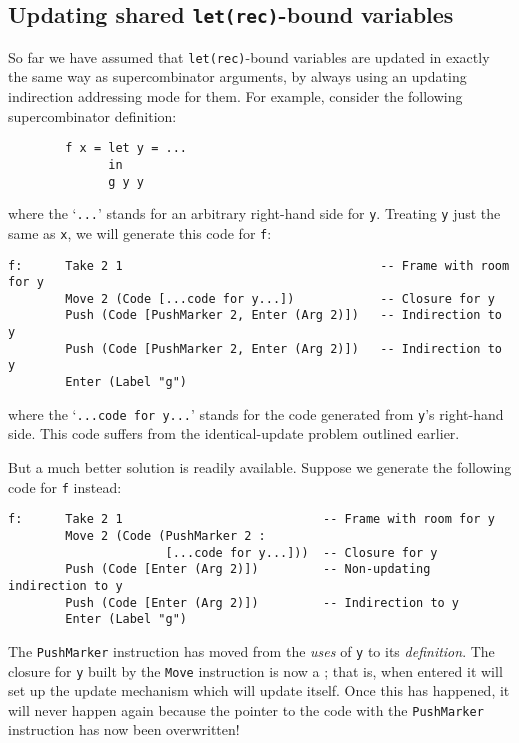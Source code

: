 \subsection{Updating shared \mbox{\tt let(rec)}-bound variables}
\label{sect:tim:self-update}

So far we have assumed that \mbox{\tt let(rec)}-bound variables are updated
in exactly the same way as supercombinator arguments, by always using
an updating indirection addressing mode for them.
For example, consider the following supercombinator definition:
\begin{verbatim}
        f x = let y = ...
              in
              g y y
\end{verbatim}
where the `\mbox{\tt ...}' stands for an arbitrary right-hand side for \mbox{\tt y}.
Treating \mbox{\tt y} just the same as \mbox{\tt x}, we will generate this code for \mbox{\tt f}:
\begin{verbatim}
f:      Take 2 1                                    -- Frame with room for y
        Move 2 (Code [...code for y...])            -- Closure for y
        Push (Code [PushMarker 2, Enter (Arg 2)])   -- Indirection to y
        Push (Code [PushMarker 2, Enter (Arg 2)])   -- Indirection to y
        Enter (Label "g")
\end{verbatim}
where the `\mbox{\tt ...code\ for\ y...}' stands for the code generated from
\mbox{\tt y}'s right-hand side.
This code suffers from the 
identical-update problem outlined earlier.

But a much better
solution is readily available.
Suppose we generate the following code for \mbox{\tt f} instead:
\begin{verbatim}
f:      Take 2 1                            -- Frame with room for y
        Move 2 (Code (PushMarker 2 :
                      [...code for y...]))  -- Closure for y
        Push (Code [Enter (Arg 2)])         -- Non-updating indirection to y
        Push (Code [Enter (Arg 2)])         -- Indirection to y
        Enter (Label "g")
\end{verbatim}
The \mbox{\tt PushMarker} instruction has moved from the {\em uses\/} of \mbox{\tt y}
to its {\em definition}.  The closure for \mbox{\tt y} built by the \mbox{\tt Move} instruction
is now a ;
that is, when entered it will set up the update
mechanism which will update itself.  Once this has happened, it will never
happen again because the pointer to the code with the \mbox{\tt PushMarker} instruction
has now been overwritten!

